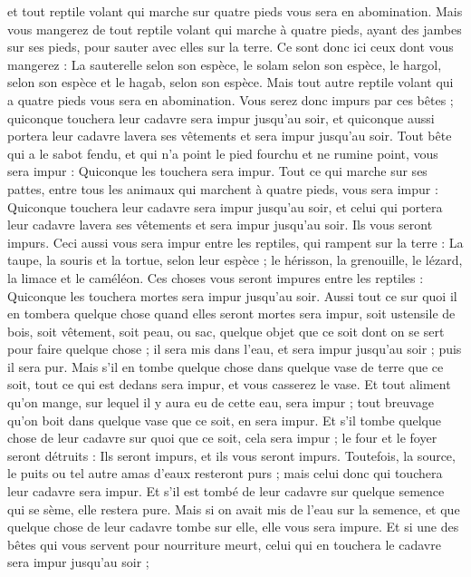 \begin{multicols}{2}
et tout reptile volant qui marche sur quatre pieds vous sera en abomination.
Mais vous mangerez de tout reptile volant qui marche à quatre pieds, ayant des jambes sur ses pieds, pour sauter avec elles sur la terre.
Ce sont donc ici ceux dont vous mangerez : La sauterelle selon son espèce, le solam selon son espèce, le hargol, selon son espèce et le hagab, selon son espèce.
Mais tout autre reptile volant qui a quatre pieds vous sera en abomination.
Vous serez donc impurs par ces bêtes ; quiconque touchera leur cadavre sera impur jusqu'au soir,
et quiconque aussi portera leur cadavre lavera ses vêtements et sera impur jusqu'au soir.
Tout bête qui a le sabot fendu, et qui n'a point le pied fourchu et ne rumine point, vous sera impur : Quiconque les touchera sera impur.
Tout ce qui marche sur ses pattes, entre tous les animaux qui marchent à quatre pieds, vous sera impur : Quiconque touchera leur cadavre sera impur jusqu'au soir,
et celui qui portera leur cadavre lavera ses vêtements et sera impur jusqu'au soir. Ils vous seront impurs.
Ceci aussi vous sera impur entre les reptiles, qui rampent sur la terre : La taupe, la souris et la tortue, selon leur espèce ;
le hérisson, la grenouille, le lézard, la limace et le caméléon.
Ces choses vous seront impures entre les reptiles : Quiconque les touchera mortes sera impur jusqu'au soir.
Aussi tout ce sur quoi il en tombera quelque chose quand elles seront mortes sera impur, soit ustensile de bois, soit vêtement, soit peau, ou sac, quelque objet que ce soit dont on se sert pour faire quelque chose ; il sera mis dans l'eau, et sera impur jusqu'au soir ; puis il sera pur.
Mais s'il en tombe quelque chose dans quelque vase de terre que ce soit, tout ce qui est dedans sera impur, et vous casserez le vase.
Et tout aliment qu'on mange, sur lequel il y aura eu de cette eau, sera impur ; tout breuvage qu'on boit dans quelque vase que ce soit, en sera impur.
Et s'il tombe quelque chose de leur cadavre sur quoi que ce soit, cela sera impur ; le four et le foyer seront détruits : Ils seront impurs, et ils vous seront impurs.
Toutefois, la source, le puits ou tel autre amas d'eaux resteront purs ; mais celui donc qui touchera leur cadavre sera impur.
Et s'il est tombé de leur cadavre sur quelque semence qui se sème, elle restera pure.
Mais si on avait mis de l'eau sur la semence, et que quelque chose de leur cadavre tombe sur elle, elle vous sera impure.
Et si une des bêtes qui vous servent pour nourriture meurt, celui qui en touchera le cadavre sera impur jusqu'au soir ;

\end{multicols}
